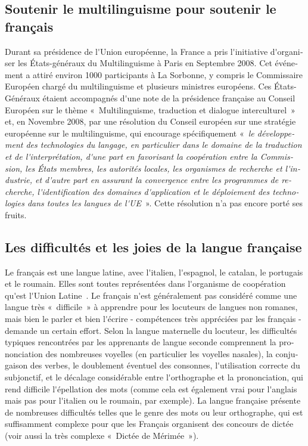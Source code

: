\begin{french}
\begin{multicols}{2}
\subsection{Soutenir le multilinguisme pour soutenir le français}

Durant sa présidence de l{\mbox '}Union européenne, la France a pris
l{\mbox '}initiative d{\mbox '}organiser les États-généraux du
Multilinguisme à Paris en Septembre 2008. Cet événement a attiré
environ 1000 participants à La Sorbonne, y compris le Commissaire
Européen chargé du multilinguisme et plusieurs ministres
européens. Ces États-Généraux étaient accompagnés d{\mbox '}une note
de la présidence française au Conseil Européen sur le thème
«~Multilinguisme, traduction et dialogue interculturel~» et, en
Novembre 2008, par une résolution du Conseil européen sur une
stratégie européenne sur le multilinguisme, qui encourage
spécifiquement «~{\em le développement des technologies du langage, en
    particulier dans le domaine de la traduction et de l{\mbox
      '}interprétation, d{\mbox '}une part en favorisant la
    coopération entre la Commission, les États membres, les autorités
    locales, les organismes de recherche et l{\mbox '}industrie, et
    d{\mbox '}autre part en assurant la convergence entre les
    programmes de recherche, l{\mbox '}identification des domaines
    d{\mbox '}application et le déploiement des technologies dans
    toutes les langues de l{\mbox '}UE}~»\cite{eurlex}. Cette
résolution n'a pas encore porté ses fruits.

\subsection{Les difficultés et les joies de la langue française}

Le français est une langue latine, avec l{\mbox '}italien, l{\mbox
  '}espagnol, le catalan, le portugais et le roumain. Elles sont
toutes représentées dans l{\mbox '}organisme de coopération qu{\mbox
  '}est l{\mbox '}Union Latine~\cite{ulatine}. Le français n{\mbox
  '}est généralement pas considéré comme une langue très «~difficile~»
à apprendre pour les locuteurs de langues non romanes, mais bien le
parler et bien l{\mbox '}écrire - compétences très appréciées par les
français - demande un certain effort. Selon la langue maternelle du
locuteur, les difficultés typiques rencontrées par les apprenants de
langue seconde comprennent la prononciation des nombreuses voyelles
(en particulier les voyelles nasales), la conjugaison des verbes, le
doublement éventuel des consonnes, l{\mbox '}utilisation correcte du
subjonctif, et le décalage considérable entre l{\mbox '}orthographe et
la prononciation, qui rend difficile l{\mbox '}épellation des mots
(comme cela est également vrai pour l{\mbox '}anglais mais pas pour
l{\mbox '}italien ou le roumain, par exemple). La langue française
présente de nombreuses difficultés telles que le genre des mots ou
leur orthographe, qui est suffisamment complexe pour que les Français
organisent des concours de dictée (voir aussi la très complexe
«~Dictée de Mérimée~»).


\end{multicols}
\end{french}
